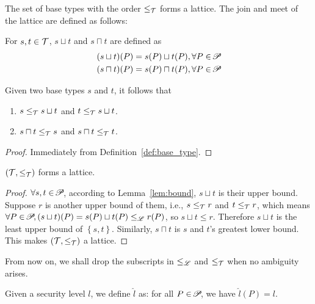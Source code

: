 {The set of base types with the order $\leq_{\mathcal{T}}$ forms a lattice. The join and meet
of the lattice are defined as follows:

\begin{definition}\label{def:type-cup-cap}
For $s, t\in\mathcal{T}$, $s\sqcup t$ and $s\sqcap t$ are defined as
\begin{align*}
(s\sqcup t)(P) =  s(P)\sqcup t(P), \forall P \in \!\mathscr{P}\!\\
(s\sqcap t)(P) =  s(P)\sqcap t(P), \forall P \in \!\mathscr{P}\!
\end{align*}
\end{definition}


\begin{lemma}\label{lem:bound}
Given two base types $s$ and $t$, it follows that
\begin{enumerate}[label*=(\alph*)]
\item $s \leq_{\mathcal{T}} s\sqcup t$ and $t\leq_{\mathcal{T}} s\sqcup t$.
\item $s\sqcap t \leq_{\mathcal{T}} s$ and $s\sqcap t \leq_{\mathcal{T}} t$.
\end{enumerate}
\end{lemma}
 \begin{proof}
Immediately from Definition~\ref{def:base_type}.
 \end{proof}


\begin{lemma}\label{lem:lattice}
$(\mathcal{T}, \leq_{\mathcal{T}})$ forms a lattice.
\end{lemma}
 \begin{proof}
 $\forall s,t\in\!\mathscr{P}\!$, according to Lemma~\ref{lem:bound}, $s \sqcup t$ is their upper bound. Suppose $r$ is another upper bound of them, i.e., $s\leq_{\mathcal{T}} r$ and $t\leq_{\mathcal{T}} r$, which means $\forall P\in\!\mathscr{P}\!, (s\sqcup t)(P)=s(P)\sqcup t(P)\leq_{\mathscr{L}} r(P)$, so $s\sqcup t\leq r$. Therefore $s\sqcup t$ is the least upper bound of $\left\{s,t\right\}$. Similarly, $s\sqcap t$ is $s$ and $t$'s greatest lower bound. This makes $(\mathcal{T}, \leq_{\mathcal{T}})$ a lattice.
 \end{proof}


From now on, we shall drop the subscripts in $\leq_{\mathscr{L}}$ and $\leq_{\mathcal{T}}$ when no ambiguity arises.



\begin{definition}
\label{def:embed}
Given a security level $l$, we define $\hat{l}$ as:
for all $P \in \!\mathscr{P}\!$, we have $\hat{l}(P) = l$.
\end{definition}

}
